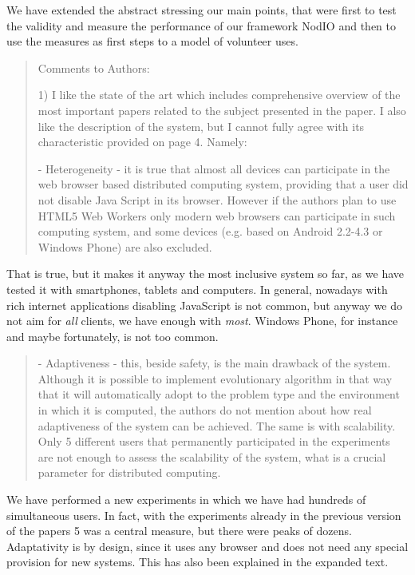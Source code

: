 \documentclass[preprint]{elsarticle}
\begin{document}
We have extended the abstract stressing our main points, that were
first to test the validity and measure the performance of our
framework NodIO and then to use the measures as first steps to a model
of volunteer uses. 


\begin{quote}
Comments to Authors:

1) I like the state of the art which includes comprehensive overview of the most important papers related
to the subject presented in the paper. I also like the description of the system, but I cannot fully agree
with its characteristic provided on page 4. Namely:
 
 - Heterogeneity - it is true that almost all devices can participate in the web browser based
 distributed computing system, providing that a user did not disable Java Script in its browser.
 However if the authors plan to use HTML5 Web Workers only modern web browsers can
 participate in such computing system, and some devices (e.g. based on Android 2.2-4.3 or
 Windows Phone) are also excluded.
 
\end{quote}

That is true, but it makes it anyway the most inclusive system so
far, as we have tested it with smartphones, tablets and computers. In
general, nowadays with rich internet applications disabling JavaScript
is not common, but anyway we do not aim for {\em all} clients, we have
enough with {\em most}. Windows Phone, for instance and maybe
fortunately, is not too common. %

\begin{quote}
 - Adaptiveness - this, beside safety, is the main drawback of the system. Although it is possible to
 implement evolutionary algorithm in that way that it will automatically adopt to the problem type
 and the environment in which it is computed, the authors do not mention about how real
 adaptiveness of the system can be achieved. The same is with scalability. Only 5 different users
 that permanently participated in the experiments are not enough to assess the scalability of the
 system, what is a crucial parameter for distributed computing.
\end{quote}

We have performed a new experiments in which we have had hundreds of
simultaneous users. In fact, with the experiments already in the
previous version of the papers 5 was a central measure, but there were
peaks of dozens. 
Adaptativity is by design, since it uses any browser and does not need
any special provision for new systems. This has also been explained in
the expanded text.
\end{document}
